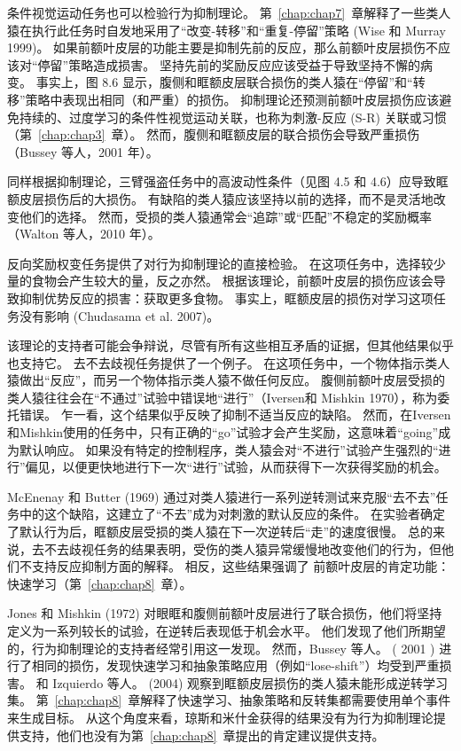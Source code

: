 条件视觉运动任务也可以检验行为抑制理论。
第~\ref{chap:chap7}~章解释了一些类人猿在执行此任务时自发地采用了“改变-转移”和“重复-停留”策略 (Wise 和 Murray 1999)。
如果前额叶皮层的功能主要是抑制先前的反应，那么前额叶皮层损伤不应该对“停留”策略造成损害。
坚持先前的奖励反应应该受益于导致坚持不懈的病变。 
事实上，图 8.6 显示，腹侧和眶额皮层联合损伤的类人猿在“停留”和“转移”策略中表现出相同（和严重）的损伤。
抑制理论还预测前额叶皮层损伤应该避免持续的、过度学习的条件性视觉运动关联，也称为刺激-反应 (S-R) 关联或习惯（第~\ref{chap:chap3}~章）。
然而，腹侧和眶额皮层的联合损伤会导致严重损伤（Bussey 等人，2001 年）。
\par


同样根据抑制理论，三臂强盗任务中的高波动性条件（见图 4.5 和 4.6）应导致眶额皮层损伤后的大损伤。
有缺陷的类人猿应该坚持以前的选择，而不是灵活地改变他们的选择。
然而，受损的类人猿通常会“追踪”或“匹配”不稳定的奖励概率（Walton 等人，2010 年）。
\par


反向奖励权变任务提供了对行为抑制理论的直接检验。
在这项任务中，选择较少量的食物会产生较大的量，反之亦然。
根据该理论，前额叶皮层的损伤应该会导致抑制优势反应的损害：获取更多食物。
事实上，眶额皮层的损伤对学习这项任务没有影响 (Chudasama et al. 2007)。
\par


该理论的支持者可能会争辩说，尽管有所有这些相互矛盾的证据，但其他结果似乎也支持它。
去不去歧视任务提供了一个例子。
在这项任务中，一个物体指示类人猿做出“反应”，而另一个物体指示类人猿不做任何反应。
腹侧前额叶皮层受损的类人猿往往会在“不通过”试验中错误地“进行”（Iversen和 Mishkin 1970），称为委托错误。
乍一看，这个结果似乎反映了抑制不适当反应的缺陷。
然而，在Iversen和Mishkin使用的任务中，只有正确的“go”试验才会产生奖励，这意味着“going”成为默认响应。
如果没有特定的控制程序，类人猿会对“不进行”试验产生强烈的“进行”偏见，以便更快地进行下一次“进行”试验，从而获得下一次获得奖励的机会。
\par


McEnenay 和 Butter (1969) 通过对类人猿进行一系列逆转测试来克服“去不去”任务中的这个缺陷，这建立了“不去”成为对刺激的默认反应的条件。
在实验者确定了默认行为后，眶额皮层受损的类人猿在下一次逆转后“走”的速度很慢。
总的来说，去不去歧视任务的结果表明，受伤的类人猿异常缓慢地改变他们的行为，但他们不支持反应抑制方面的解释。
相反，这些结果强调了 前额叶皮层的肯定功能：快速学习（第~\ref{chap:chap8}~章）。
\par


Jones 和 Mishkin (1972) 对眼眶和腹侧前额叶皮层进行了联合损伤，他们将坚持定义为一系列较长的试验，在逆转后表现低于机会水平。
他们发现了他们所期望的，行为抑制理论的支持者经常引用这一发现。
然而，Bussey 等人。 ( 2001 ) 进行了相同的损伤，发现快速学习和抽象策略应用（例如“lose-shift”）均受到严重损害。
和 Izquierdo 等人。 (2004) 观察到眶额皮层损伤的类人猿未能形成逆转学习集。
第~\ref{chap:chap8}~章解释了快速学习、抽象策略和反转集都需要使用单个事件来生成目标。
从这个角度来看，琼斯和米什金获得的结果没有为行为抑制理论提供支持，他们也没有为第~\ref{chap:chap8}~章提出的肯定建议提供支持。
\par


